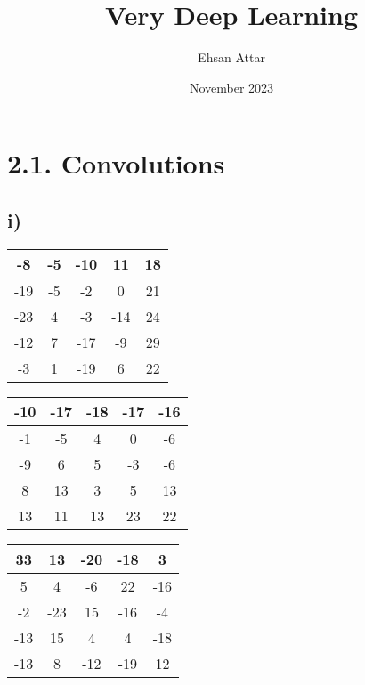 \documentclass{article}
\title{Very Deep Learning}
\author{Ehsan Attar}
\date{November 2023}
\begin{document}
\section*{2.1. Convolutions}

\subsection*{i)}
\begin{table}[h]
  \centering
  \begin{tabular}{|c|c|c|c|c|}
    \hline
    -8 & -5 & -10 & 11 & 18 \\
    \hline
    -19 & -5 & -2 & 0 & 21 \\
    \hline
    -23 & 4 & -3 & -14 & 24 \\
    \hline
    -12 & 7 & -17 & -9 & 29 \\
    \hline
    -3 & 1 & -19 & 6 & 22 \\
    \hline
  \end{tabular}
\end{table}

\hspace{\fill}

\begin{table}[h]
  \centering
  \begin{tabular}{|c|c|c|c|c|}
    \hline
    -10 & -17 & -18 & -17 & -16 \\
    \hline
    -1 & -5 & 4 & 0 & -6 \\
    \hline
    -9 & 6 & 5 & -3 & -6 \\
    \hline
    8 & 13 & 3 & 5 & 13 \\
    \hline
    13 & 11 & 13 & 23 & 22 \\
    \hline
  \end{tabular}
\end{table}

\hspace{\fill}

\begin{table}[h]
  \centering
  \begin{tabular}{|c|c|c|c|c|}
    \hline
    33 & 13 & -20 & -18 & 3 \\
    \hline
    5 & 4 & -6 & 22 & -16 \\
    \hline
    -2 & -23 & 15 & -16 & -4 \\
    \hline
    -13 & 15 & 4 & 4 & -18 \\
    \hline
    -13 & 8 & -12 & -19 & 12 \\
    \hline
  \end{tabular}
\end{table}
\end{document}
